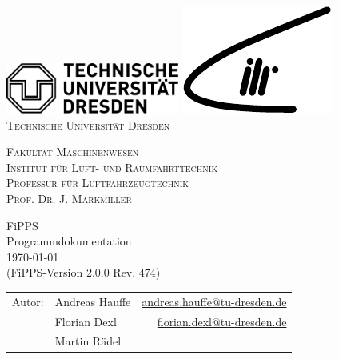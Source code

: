 \documentclass[11pt,titlepage,listof=totoc,bibliography=totoc,twoside]{scrreprt}
\begin{document}
\begin{titlepage}
	\enlargethispage{1cm}
	\newlength{\logoheight}
	\includegraphics[width=57mm]{Logo/TU_Logo_SW}	\hfill	\includegraphics[height=\logoheight]{Logo/ILR_Logo_redone}\\[1cm]
	
	\centering
	\huge
	\textsc{Technische Universität Dresden}

	\bigskip
	\Large
	\textsc{Fakultät Maschinenwesen\\
	Institut für Luft- und Raumfahrttechnik\\
	Professur für Luftfahrzeugtechnik\\
	Prof. Dr. J. Markmiller}
    
	\vspace{2.5cm}
	\centering
	\huge
	FiPPS\\[0.5cm]
	
	\Large
	\huge
	Programmdokumentation\\[0.5cm]
	\Large
	\today\\[0.5cm]
	(FiPPS-Version 2.0.0 Rev. 474)
	\normalsize
	\vfill
	\begin{tabular}{ll@{\qquad}r}
	Autor:	&	Andreas Hauffe  & 	\url{andreas.hauffe@tu-dresden.de} \\
		    &	Florian Dexl	& 	\url{florian.dexl@tu-dresden.de} \\
		    &	Martin Rädel	&	 \\
	\end{tabular}
	
\end{titlepage}

\setcounter{page}{1}
\end{document}
